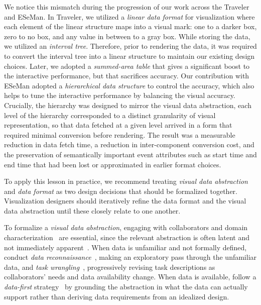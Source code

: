 \begin{refsection}
We notice this mismatch during the progression of our work across the Traveler and ESeMan. In Traveler, we utilized a \textit{linear data format} for visualization where each element of the linear structure maps into a visual mark: one to a darker box, zero to no box, and any value in between to a gray box. While storing the data, we utilized an \textit{interval tree}. Therefore, prior to rendering the data, it was required to convert the interval tree into a linear structure to maintain our existing design choices. Later, we adopted a \textit{summed-area table} that gives a significant boost to the interactive performance, but that sacrifices accuracy. Our contribution with ESeMan adopted a \textit{hierarchical data structure} to control the accuracy, which also helps to tune the interactive performance by balancing the visual accuracy. Crucially, the hierarchy was designed to mirror the visual data abstraction, each level of the hierarchy corresponded to a distinct granularity of visual representation, so that data fetched at a given level arrived in a form that required minimal conversion before rendering. The result was a measurable reduction in data fetch time, a reduction in inter-component conversion cost, and the preservation of semantically important event attributes such as start time and end time that had been lost or approximated in earlier format choices.

To apply this lesson in practice, we recommend treating \textit{visual data abstraction} and \textit{data format} as two design decisions that should be formalized together. Visualization designers should iteratively refine the data format and the visual data abstraction until these closely relate to one another.

To formalize a \textit{visual data abstraction}, engaging with collaborators and domain characterization~\cite{munzner2009nested, Sedlmair2012} are essential, since the relevant abstraction is often latent and not immediately apparent~\cite{bigelow2020guidelines}. When data is unfamiliar and not formally defined, conduct \textit{data reconnaissance}~\cite{crisan2019uncovering}, making an exploratory pass through the unfamiliar data, and \textit{task wrangling}~\cite{crisan2019uncovering}, progressively revising task descriptions as collaborators' needs and data availability change. When data is available, follow a \textit{data-first} strategy~\cite{oppermann2020data} by grounding the abstraction in what the data can actually support rather than deriving data requirements from an idealized design.


\end{refsection}
